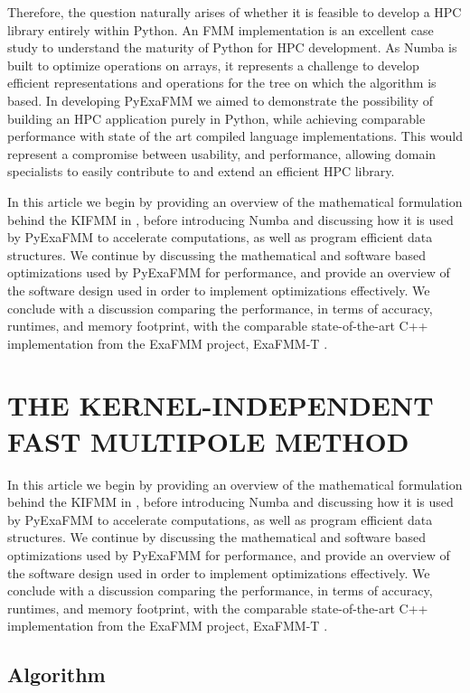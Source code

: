 \documentclass{IEEEcsmag}
\begin{document}
Therefore, the question naturally arises of whether it is feasible to develop a HPC library entirely within Python. An FMM implementation is an excellent case study to understand the maturity of Python for HPC development. As Numba is built to optimize operations on arrays, it represents a challenge to develop efficient representations and operations for the tree on which the algorithm is based. In developing PyExaFMM we aimed to demonstrate the possibility of building an HPC application purely in Python, while achieving comparable performance with state of the art compiled language implementations. This would represent a compromise between usability, and performance, allowing domain specialists to easily contribute to and extend an efficient HPC library.

In this article we begin by providing an overview of the mathematical formulation behind the KIFMM in \cite{Ying2004}, before introducing Numba and discussing how it is used by PyExaFMM to accelerate computations, as well as program efficient data structures. We continue by discussing the mathematical and software based optimizations used by PyExaFMM for performance, and provide an overview of the software design used in order to implement optimizations effectively. We conclude with a discussion comparing the performance, in terms of accuracy, runtimes, and memory footprint, with the comparable state-of-the-art C++ implementation from the ExaFMM project, ExaFMM-T \cite{Wang2021}.

\section{THE KERNEL-INDEPENDENT FAST MULTIPOLE METHOD}
In this article we begin by providing an overview of the mathematical formulation behind the KIFMM in \cite{Ying2004}, before introducing Numba and discussing how it is used by PyExaFMM to accelerate computations, as well as program efficient data structures. We continue by discussing the mathematical and software based optimizations used by PyExaFMM for performance, and provide an overview of the software design used in order to implement optimizations effectively. We conclude with a discussion comparing the performance, in terms of accuracy, runtimes, and memory footprint, with the comparable state-of-the-art C++ implementation from the ExaFMM project, ExaFMM-T \cite{Wang2021}.


\subsection{Algorithm}
\end{document}
